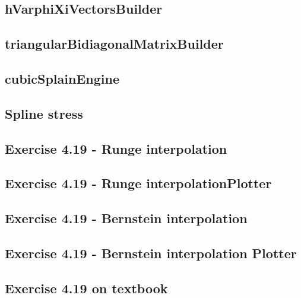 \subsection{hVarphiXiVectorsBuilder}
\label{subsec:hVarphiXiVectorsBuilder}


\subsection{triangularBidiagonalMatrixBuilder}
\label{subsec:triangularBidiagonalMatrixBuilder}


\subsection{cubicSplainEngine}
\label{subsec:cubicSplainEngine}


\subsection{Spline stress}
\label{subsec:splineStress}


\subsection{Exercise 4.19 - Runge interpolation}
\label{subsec:exercise419RungeInterpolation}


\subsection{Exercise 4.19 - Runge interpolationPlotter}
\label{subsec:exercise419RungeInterpolationPlotter}


\subsection{Exercise 4.19 - Bernstein interpolation}
\label{subsec:exercise419BernsteinInterpolation}


\subsection{Exercise 4.19 - Bernstein interpolation Plotter}
\label{subsec:exercise419BernsteinInterpolationPlotter}


\subsection{Exercise 4.19 on textbook}
\label{subsec:exercise419}
